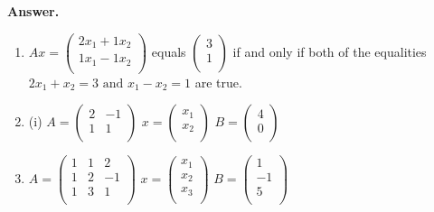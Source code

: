 \documentclass[10pt,]{book}
\theoremstyle{plain}
\theoremstyle{definition}
\theoremstyle{definition}
\theoremstyle{definition}
\theoremstyle{definition}
\begin{document}
\begin{exercisegroup}
\begin{enumerate}[label=\alph*]
%
\end{enumerate}
%
\par\smallskip
\par\smallskip
\noindent\textbf{Answer.}\hypertarget{answer-4}{}\quad
\leavevmode%
\begin{enumerate}[label=\alph*]
\item\hypertarget{li-40}{} \(Ax=\left(
\begin{array}{c}
 2x_1+1x_2 \\
 1x_1-1x_2 \\
\end{array}
\right)\) equals \(\left(
\begin{array}{c}
 3 \\
 1 \\
\end{array}
\right)\) if and only if both of the equalities 
     \(2x_1+x_2=3 \textrm{ and } x_1-x_2=1\) are true.%
\item\hypertarget{li-41}{} (i)  \(A=\left(
\begin{array}{cc}
 2 & -1 \\
 1 & 1 \\
\end{array}
\right)\)   \(x=\left(
\begin{array}{c}
 x_1 \\
 x_2 \\
\end{array}
\right)\)   \(B=\left(
\begin{array}{c}
 4 \\
 0 \\
\end{array}
\right)\)
%
\item\hypertarget{li-42}{}  \(A=\left(
\begin{array}{ccc}
 1 & 1 & 2 \\
 1 & 2 & -1 \\
 1 & 3 & 1 \\
\end{array}
\right)\) \(x=\left(
\begin{array}{c}
 x_1 \\
 x_2 \\
 x_3 \\
\end{array}
\right)\)   \(B=\left(
\begin{array}{c}
 1 \\
 -1 \\
 5 \\
\end{array}
\right)\)

\end{enumerate}
\end{exercisegroup}
\end{document}
